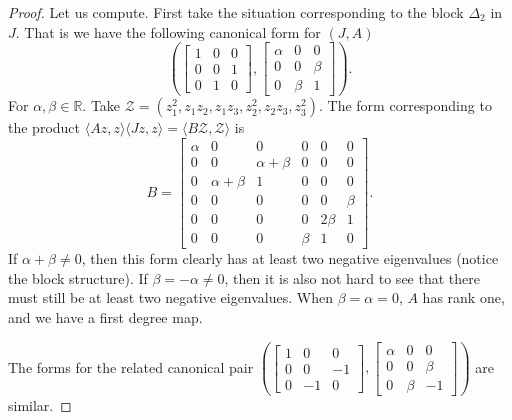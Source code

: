 \documentclass[12pt,openany]{book}
\newcommand{\R}{{\mathbb{R}}}
\newcommand{\sZ}{{\mathcal{Z}}}
\theoremstyle{plain}
\theoremstyle{remark}
\theoremstyle{definition}
\theoremstyle{exercise}
\theoremstyle{example}
\begin{document}
\begin{proof}
Let us compute.  First take the situation corresponding to
the block $\Delta_2$ in $J$.  That is we have the following canonical form 
for $(J,A)$
\begin{equation}
\left(
\begin{bmatrix}
       1 &        0 &        0\\
       0 &        0 &        1\\
       0 &        1 &        0
\end{bmatrix}
,
\begin{bmatrix}
  \alpha &        0 &        0\\
       0 &        0 &    \beta\\
       0 &    \beta &        1
\end{bmatrix}
\right).
\end{equation}
For $\alpha, \beta \in \R$.
Take
$\sZ = (z_1^2,z_1z_2,z_1z_3,z_2^2,z_2z_3,z_3^2)$.
The form corresponding to the product
$\langle A z, z \rangle \langle J z, z \rangle  = \langle B \sZ , \sZ
\rangle$ is
\begin{equation} \label{form1B}
B=
\begin{bmatrix}
  \alpha &        0 &        0 &        0 &        0 &        0\\
       0 &        0 & \alpha+\beta &        0 &        0 &        0\\
       0 & \alpha+\beta &        1 &        0 &        0 &        0\\
       0 &        0 &        0 &        0 &        0 &    \beta\\
       0 &        0 &        0 &        0 &   2\beta &        1\\
       0 &        0 &        0 &    \beta &        1 &        0
\end{bmatrix} .
\end{equation}
If $\alpha+\beta \not= 0$, then
this form clearly has at least two negative eigenvalues (notice the block
structure). 
If $\beta = -\alpha \not= 0$, then it is also not hard to see that there must
still be at least two negative eigenvalues.  When $\beta = \alpha = 0$,
$A$ has rank one, and we have a first degree map.

The forms for the related canonical pair
$\left(
\left[
\begin{smallmatrix}
       1 &        0 &        0\\
       0 &        0 &        -1\\
       0 &        -1 &        0
\end{smallmatrix}
\right]
,
\left[
\begin{smallmatrix}
  \alpha &        0 &        0\\
       0 &        0 &    \beta\\
       0 &    \beta &        -1
\end{smallmatrix}
\right]
\right)$ are similar.



\end{proof}
\end{document}
